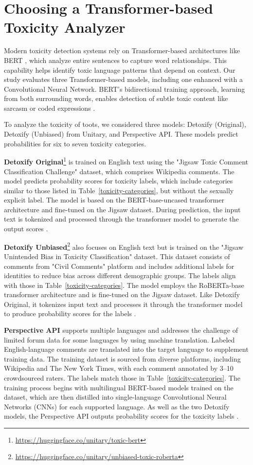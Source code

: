 \chapter{Choosing a Transformer-based Toxicity Analyzer} \label{choosing-toxicity-analyzer}
Modern toxicity detection systems rely on Transformer-based architectures like BERT \cite{devlin:2019}, which analyze entire sentences to capture word relationships. This capability helps identify toxic language patterns that depend on context. Our study evaluates three Transformer-based models, including one enhanced with a Convolutional Neural Network. BERT's bidirectional training approach, learning from both surrounding words, enables detection of subtle toxic content like sarcasm or coded expressions \cite{mathew:2021}.

To analyze the toxicity of toots, we considered three models: Detoxify (Original), Detoxify (Unbiased) from Unitary, and Perspective API. These models predict probabilities for six to seven toxicity categories.

\textbf{Detoxify Original}\footnote{\url{https://huggingface.co/unitary/toxic-bert}} is trained on English text using the "Jigsaw Toxic Comment Classification Challenge" dataset, which comprises Wikipedia comments. The model predicts probability scores for toxicity labels, which include categories similar to those listed in Table~\ref{toxicity-categories}, but without the sexually explicit label. The model is based on the BERT-base-uncased transformer architecture and fine-tuned on the Jigsaw dataset. During prediction, the input text is tokenized and processed through the transformer model to generate the output scores \cite{detoxify:medium}.

\textbf{Detoxify Unbiased}\footnote{\url{https://huggingface.co/unitary/unbiased-toxic-roberta}} also focuses on English text but is trained on the "Jigsaw Unintended Bias in Toxicity Classification" dataset. This dataset consists of comments from "Civil Comments" platform and includes additional labels for identities to reduce bias across different demographic groups. The labels align with those in Table~\ref{toxicity-categories}. The model employs the RoBERTa-base~\cite{liu:2019} transformer architecture and is fine-tuned on the Jigsaw dataset. Like Detoxify Original, it tokenizes input text and processes it through the transformer model to produce probability scores for the labels \cite{detoxify:medium}.

\textbf{Perspective API} supports multiple languages and addresses the challenge of limited forum data for some languages by using machine translation. Labeled English-language comments are translated into the target language to supplement training data. The training dataset is sourced from diverse platforms, including Wikipedia and The New York Times, with each comment annotated by 3--10 crowdsourced raters. The labels match those in Table~\ref{toxicity-categories}. The training process begins with multilingual BERT-based models trained on the dataset, which are then distilled into single-language Convolutional Neural Networks (CNNs) for each supported language. As well as the two Detoxify models, the Perspective API outputs probability scores for the toxicity labels \cite{lees:2022}.

